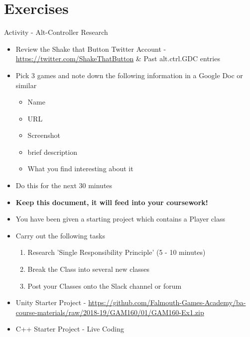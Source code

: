 \part{Exercises}
\frame{\partpage}

\begin{frame}{Activity - Alt-Controller Research}
\begin{itemize}
	\pause \item Review the Shake that Button Twitter Account - \url{https://twitter.com/ShakeThatButton} \& Past alt.ctrl.GDC entries
	\pause \item Pick 3 games and note down the following information in a Google Doc or similar
	\begin{itemize}
		\pause\item Name
		\item URL
		\item Screenshot
		\item brief description
		\item What you find interesting about it 
	\end{itemize}
	\pause \item Do this for the next 30 minutes
	\pause \item \textbf{Keep this document, it will feed into your coursework!}
\end{itemize}
\end{frame}

\begin{frame}
\begin{itemize}
	\pause \item You have been given a starting project which contains a Player class
	\pause \item Carry out the following tasks
	\begin{enumerate}
		\pause \item Research 'Single Responsibility Principle' (5 - 10 minutes)
		\pause \item Break the Class into several new classes
		\pause \item Post your Classes onto the Slack channel or forum  
	\end{enumerate} 
	\pause \item Unity Starter Project - \url{https://github.com/Falmouth-Games-Academy/ba-course-materials/raw/2018-19/GAM160/01/GAM160-Ex1.zip}
	\pause \item C++ Starter Project - Live Coding
\end{itemize}
\end{frame}